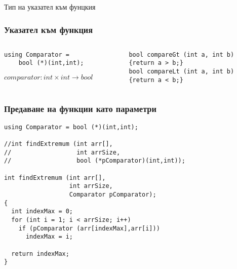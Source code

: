 \documentclass{beamer}
\begin{document}
\begin{frame}
\centerline{Тип на указател към фунцкия}
\end{frame}


\begin{frame}[fragile]
\frametitle{Указател към функция}

\begin{columns}[t]
  \begin{column}{0.5\textwidth}

\begin{flushleft}
\begin{lstlisting}
using Comparator = 
    bool (*)(int,int);
\end{lstlisting}  
\end{flushleft}

\vspace{15px}
$comparator: int \times int \rightarrow bool$

  \end{column}
  \begin{column}{0.5\textwidth}

\begin{flushleft}
\begin{lstlisting}
bool compareGt (int a, int b)
{return a > b;}
bool compareLt (int a, int b)
{return a < b;}
\end{lstlisting}  
\end{flushleft}

  \end{column}
\end{columns}

\end{frame}


\begin{frame}[fragile]
\frametitle{Предаване на функции като параметри}

\begin{flushleft}
\begin{lstlisting}
using Comparator = bool (*)(int,int);

//int findExtremum (int arr[], 
//                  int arrSize, 
//                  bool (*pComparator)(int,int));

int findExtremum (int arr[], 
                  int arrSize, 
                  Comparator pComparator);
{
  int indexMax = 0;
  for (int i = 1; i < arrSize; i++)
    if (pComparator (arr[indexMax],arr[i]))
      indexMax = i;

  return indexMax;
}
\end{lstlisting}  
\end{flushleft}

  
\end{frame}
\end{document}
